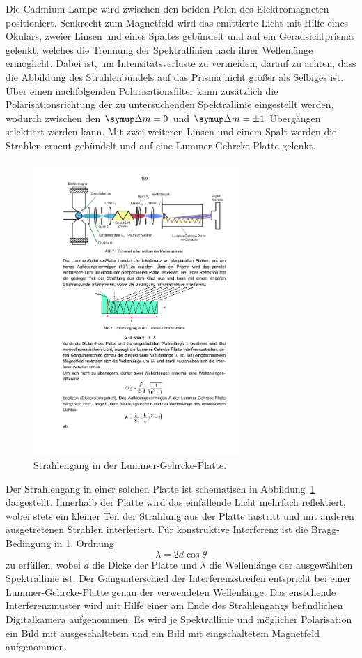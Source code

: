 Die Cadmium-Lampe wird zwischen den beiden Polen des Elektromagneten positioniert.
Senkrecht zum Magnetfeld wird das emittierte Licht mit Hilfe eines Okulars, zweier Linsen und eines Spaltes gebündelt und auf ein Geradsichtprisma gelenkt, welches die Trennung der Spektrallinien nach ihrer Wellenlänge ermöglicht.
Dabei ist, um Intensitätsverluste zu vermeiden, darauf zu achten, dass die Abbildung des Strahlenbündels auf das Prisma nicht größer als Selbiges ist.
Über einen nachfolgenden Polarisationsfilter kann zusätzlich die Polarisationsrichtung der zu untersuchenden Spektrallinie eingestellt werden, wodurch zwischen den $\upD m=0$ und $\upD m=\pm1$ Übergängen selektiert werden kann.
Mit zwei weiteren Linsen und einem Spalt werden die Strahlen erneut gebündelt und auf eine Lummer-Gehrcke-Platte gelenkt.
%
\begin{figure}
    \centering
    \includegraphics[width=0.7\textwidth]{figure/lummer-gehrcke.pdf}
    \caption{Strahlengang in der Lummer-Gehrcke-Platte.\cite{V27}}
    \label{fig:lummer-gehrcke}
\end{figure}
%
Der Strahlengang in einer solchen Platte ist schematisch in Abbildung~\ref{fig:lummer-gehrcke} dargestellt.
Innerhalb der Platte wird das einfallende Licht mehrfach reflektiert, wobei stets ein kleiner Teil der Strahlung aus der Platte austritt und mit anderen ausgetretenen Strahlen interferiert.
Für konstruktive Interferenz ist die Bragg-Bedingung in 1. Ordnung
%
\begin{equation}
    \lambda=2d\cos\theta
\end{equation}
%
zu erfüllen, wobei $d$ die Dicke der Platte und $\lambda$ die Wellenlänge der ausgewählten Spektrallinie ist.
Der Gangunterschied der Interferenzstreifen entspricht bei einer Lummer-Gehrcke-Platte genau der verwendeten Wellenlänge.
Das enstehende Interferenzmuster wird mit Hilfe einer am Ende des Strahlengangs befindlichen Digitalkamera aufgenommen.
Es wird je Spektrallinie und möglicher Polarisation ein Bild mit ausgeschaltetem und ein Bild mit eingschaltetem Magnetfeld aufgenommen.

